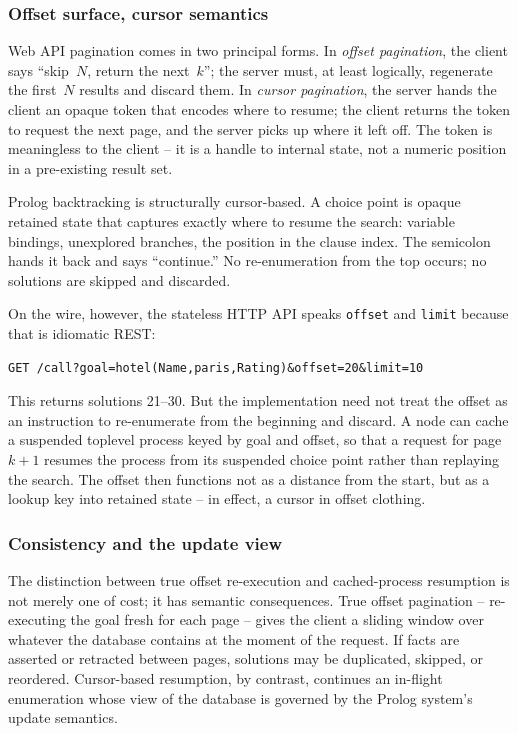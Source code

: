 \subsubsection{Offset surface, cursor semantics}

Web API pagination comes in two principal forms. In \emph{offset
pagination}, the client says ``skip~$N$, return the next~$k$''; the
server must, at least logically, regenerate the first~$N$ results
and discard them. In \emph{cursor pagination}, the server hands the
client an opaque token that encodes where to resume; the client
returns the token to request the next page, and the server picks up
where it left off. The token is meaningless to the client -- it is a
handle to internal state, not a numeric position in a pre-existing
result set.

Prolog backtracking is structurally cursor-based. A choice point is
opaque retained state that captures exactly where to resume the
search: variable bindings, unexplored branches, the position in the
clause index. The semicolon hands it back and says ``continue.'' No
re-enumeration from the top occurs; no solutions are skipped and
discarded.

On the wire, however, the stateless HTTP API speaks \texttt{offset}
and \texttt{limit} because that is idiomatic REST:
%
\begin{verbatim}
GET /call?goal=hotel(Name,paris,Rating)&offset=20&limit=10
\end{verbatim}
%
This returns solutions 21--30. But the implementation need not treat
the offset as an instruction to re-enumerate from the beginning and
discard. A node can cache a suspended toplevel process keyed by goal
and offset, so that a request for page~$k{+}1$ resumes the process
from its suspended choice point rather than replaying the search.
The offset then functions not as a distance from the start, but as a
lookup key into retained state -- in effect, a cursor in offset
clothing.


\subsubsection{Consistency and the update view}

The distinction between true offset re-execution and cached-process
resumption is not merely one of cost; it has semantic consequences.
True offset pagination -- re-executing the goal fresh for each page
-- gives the client a sliding window over whatever the database
contains at the moment of the request. If facts are asserted or
retracted between pages, solutions may be duplicated, skipped, or
reordered. Cursor-based resumption, by contrast, continues an
in-flight enumeration whose view of the database is governed by the
Prolog system's update semantics.

